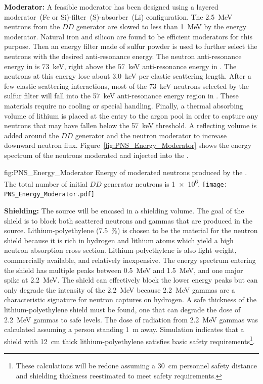 {\bf Moderator:}  A feasible moderator has been designed using a layered moderator~(Fe or Si)-filter~(S)-absorber~(Li) %
configuration. The \SI{2.5}{\MeV} neutrons from the $DD$ generator are slowed to less than \SI{1}{\MeV} by the energy moderator. Natural iron and silicon are found to be efficient moderators for this purpose. Then an energy filter made of sulfur powder is used to further select the neutrons with the desired anti-resonance energy.
The neutron anti-resonance energy in  is \SI{73}{\keV}, right above the \SI{57}{\keV} anti-resonance energy in . The neutrons at this energy lose about \SI{3.0}{\keV} per elastic scattering length. After a few elastic scattering interactions, most of the \SI{73}{\keV} neutrons selected by the sulfur filter will fall into the \SI{57}{\keV} anti-resonance energy region in . These materials require no cooling or special handling. Finally, a thermal absorbing volume of lithium is placed at the entry to the argon pool in order to capture any neutrons that may have fallen below the \SI{57}{\keV} threshold. A reflecting volume is added around the $DD$ generator and the neutron moderator to increase downward neutron flux. Figure~\ref{fig:PNS_Energy_Moderator} shows the energy spectrum of the neutrons moderated and injected into the .


\begin{dunefigure}{fig:PNS_Energy_Moderator}
{Energy of moderated neutrons produced by the . %
The total number of initial $DD$ generator neutrons is \num{1e6}.}
\texttt{[image: PNS\_Energy\_Moderator.pdf]}
\end{dunefigure}

{\bf Shielding:} The source will be encased in a shielding volume. The goal of the shield is to block both scattered neutrons and gammas that are produced in the source. Lithium-polyethylene (\SI{7.5}{\%}) is chosen to be the material for the neutron shield because it is rich in hydrogen and lithium atoms which yield a high neutron absorption cross section. Lithium-polyethylene is also light weight, commercially available, and relatively inexpensive. The energy spectrum entering the shield has multiple peaks between \SI{0.5}{\MeV} and \SI{1.5}{\MeV}, and one major spike at \SI{2.2}{\MeV}. The shield can effectively block the lower energy peaks but can only degrade the intensity of the \SI{2.2}{\MeV} because \SI{2.2}{\MeV} gammas are a characteristic signature for neutron captures on hydrogen. A safe thickness of the lithium-polyethylene shield must be found, one that can degrade the dose of \SI{2.2}{\MeV} gammas to safe levels. The dose of radiation from \SI{2.2}{\MeV} gammas was calculated assuming a person standing \SI{1}{\m} away. Simulation indicates that a shield with \SI{12}{\cm} thick lithium-polyethylene satisfies basic safety requirements\footnote{These calculations will be redone assuming a \SI{30}{\cm} personnel safety distance and shielding thickness reestimated to meet  safety requirements.}. 

